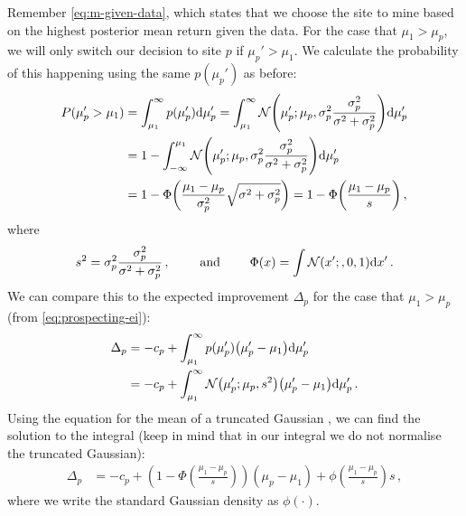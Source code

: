 \documentclass[a4paper]{article}
\theoremstyle{definition}
\begin{document}
Remember \cref{eq:m-given-data}, which states that we choose the site to mine based on the highest posterior mean return given the data. For the case that $\mu_1 > \mu_p$, we will only switch our decision to site $p$ if $\mu_p' > \mu_1$. We calculate the probability of this happening using the same $p(\mu_p')$ as before:
\begin{align}
P(\mu_p' > \mu_1) &= \int_{\mu_1}^\infty p(\mu_p') \calcd{\mu_p'} = \int_{\mu_1}^\infty \NormDist{\mu_p'; \mu_p, \sigma_p^2\frac{\sigma_p^2}{\sigma^2 + \sigma_p^2}} \calcd{\mu_p'} \nonumber \\
&= 1 - \int_{-\infty}^{\mu_1} \NormDist{\mu_p'; \mu_p, \sigma_p^2\frac{\sigma_p^2}{\sigma^2 + \sigma_p^2}} \calcd{\mu_p'} \nonumber \\
&= 1 - \Phi\left(\frac{\mu_1-\mu_p}{\sigma_p^2}\sqrt{\sigma^2 + \sigma^2_p}\right) = 1 - \Phi\left(\frac{\mu_1-\mu_p}{s}\right)  \label{eq:prob-improv} \,,
\end{align}
where
\begin{align}
s^2 = \sigma_p^2\frac{\sigma_p^2}{\sigma^2 + \sigma_p^2} \,, \qquad \text{ and } \qquad \Phi(x) = \int \NormDist{x';, 0, 1} \calcd{x'} \,.
\end{align}
We can compare this to the expected improvement $\Delta_p$ for the case that $\mu_1 > \mu_p$ (from \cref{eq:prospecting-ei}):
\begin{align}
\Delta_p &= -c_p + \int_{\mu_1}^\infty p(\mu_p')\left(\mu_p' - \mu_1\right)\calcd{\mu_p'} \\
&= -c_p + \int_{\mu_1}^\infty \NormDist{\mu_p'; \mu_p, s^2}\left(\mu_p' - \mu_1\right)\calcd{\mu_p'} \,.
\end{align}
Using the equation for the mean of a truncated Gaussian \citep{wiki:trunc-normal}, we can find the solution to the integral (keep in mind that in our integral we do not normalise the truncated Gaussian):
\begin{align}
\Delta_p &= -c_p + \left(1 - \Phi\left(\frac{\mu_1-\mu_p}{s}\right)\right)\left(\mu_p-\mu_1\right) + \phi\left(\frac{\mu_1 - \mu_p}{s}\right)s \label{eq:explicit-prospecting-ei} \,,
\end{align}
where we write the standard Gaussian density as $\phi(\cdot)$.
\end{document}
